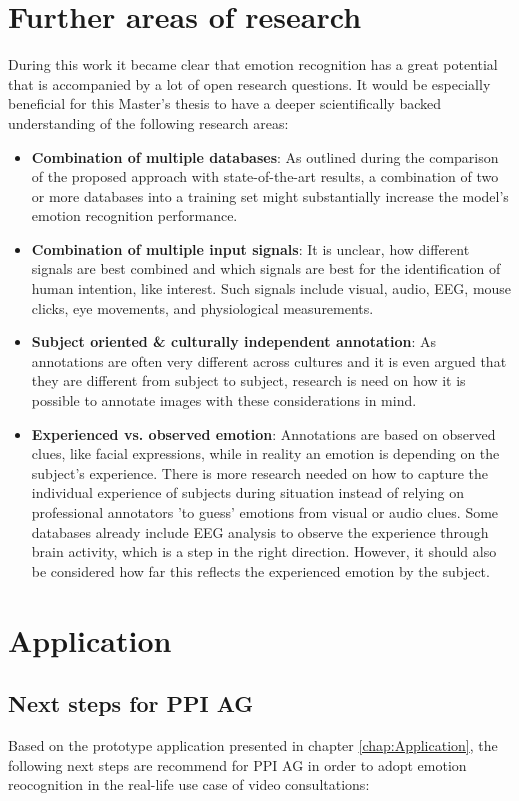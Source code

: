 \section{Further areas of research}
During this work it became clear that emotion recognition has a great potential that is accompanied by a lot of open research questions. It would be especially beneficial for this Master's thesis to have a deeper scientifically backed understanding of the following research areas:
\begin{itemize}
    \item \textbf{Combination of multiple databases}:  As outlined during the comparison of the proposed approach with state-of-the-art results, a combination of two or more databases into a training set might substantially increase the model's emotion recognition performance.
    \item \textbf{Combination of multiple input signals}: It is unclear, how different signals are best combined and which signals are best for the identification of human intention, like interest. Such signals include visual, audio, EEG, mouse clicks, eye movements, and physiological measurements.
    \item \textbf{Subject oriented \& culturally independent annotation}: As annotations are often very different across cultures and it is even argued that they are different from subject to subject, research is need on how it is possible to annotate images with these considerations in mind. 
    \item \textbf{Experienced vs. observed emotion}: Annotations are based on observed clues, like facial expressions, while in reality an emotion is depending on the subject's experience. There is more research needed on how to capture the individual experience of subjects during situation instead of relying on professional annotators 'to guess' emotions from visual or audio clues. Some databases already include EEG analysis to observe the experience through brain activity, which is a step in the right direction. However, it should also be considered how far this reflects the experienced emotion by the subject.
\end{itemize}



\section{Application}
\subsection{Next steps for PPI AG}
Based on the prototype application presented in chapter \ref{chap:Application}, the following next steps are recommend for PPI AG in order to adopt emotion reocognition in the real-life use case of video consultations:

